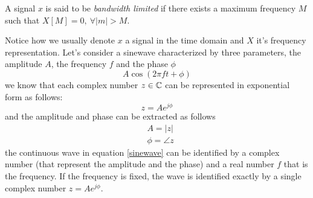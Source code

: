 \documentclass[10pt, letterpaper]{report}
\begin{document}
\begin{boxdefinition}{}{}
     A signal $x$ is said to be \textit{bandwidth limited} if there exists a maximum frequency $M$ such that $X[M]=0, \ \forall |m|>M$.
\end{boxdefinition}
\noindent Notice how we usually denote $x$ a signal in the time domain and $X$ it's frequency representation. 
Let's consider a sinewave characterized by three parameters, the amplitude $A$, the frequency $f$ and the phase $\phi$\begin{equation}\label{sinewave}
     A\cos(2\pi ft+\phi)
\end{equation}
we know that each complex number $z\in {\mathbb C}$ can be represented in exponential form as follows:\begin{equation}
     z=Ae^{j\phi}
\end{equation}
and the amplitude and phase can be extracted as follows \begin{align}
     &A=|z|\\ 
     &\phi = \angle z
\end{align}
the continuous wave in equation \eqref{sinewave} can be identified by a complex number (that represent the amplitude and the phase) and a real number $f$ that is the frequency. If the frequency is fixed, the wave is identified exactly by a single complex number $ z=Ae^{j\phi}$.
\end{document}
